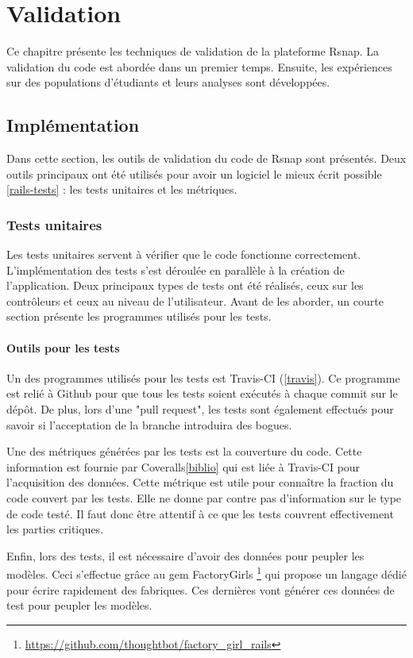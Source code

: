 \chapter{Validation}
Ce chapitre présente les techniques de validation de la plateforme Rsnap. La validation du code est abordée dans un premier temps. Ensuite, les expériences sur des populations d'étudiants et leurs analyses sont développées.

\section{Implémentation}
Dans cette section, les outils de validation du code de Rsnap sont présentés. Deux outils principaux ont été utilisés pour avoir un logiciel le mieux écrit possible \ref{rails-tests} : les tests unitaires et les métriques.

\subsection{Tests unitaires}
Les tests unitaires servent à vérifier que le code fonctionne correctement. L'implémentation des tests s'est déroulée en parallèle à la création de l'application. Deux principaux types de tests ont été réalisés, ceux sur les contrôleurs et ceux au niveau de l'utilisateur. Avant de les aborder, un courte section présente les programmes utilisés pour les tests.

\subsubsection{Outils pour les tests}
Un des programmes utilisés pour les tests est Travis-CI (\ref{travis}). Ce programme est relié à Github pour que tous les tests soient exécutés à chaque commit sur le dépôt. De plus, lors d'une "pull request", les tests sont également effectués pour savoir si l'acceptation de la branche introduira des bogues.

Une des métriques générées par les tests est la couverture du code. Cette information est fournie par Coveralls\ref{biblio} qui est liée à Travis-CI pour l'acquisition des données. Cette métrique est utile pour connaître la fraction du code couvert par les tests. Elle ne donne par contre pas d'information sur le type de code testé. Il faut donc être attentif à ce que les tests couvrent effectivement les parties critiques.

Enfin, lors des tests, il est nécessaire d'avoir des données pour peupler les modèles. Ceci s'effectue grâce au gem FactoryGirls \footnote{\url{https://github.com/thoughtbot/factory_girl_rails}} qui propose un langage dédié pour écrire rapidement des fabriques. Ces dernières vont générer ces données de test pour peupler les modèles.

